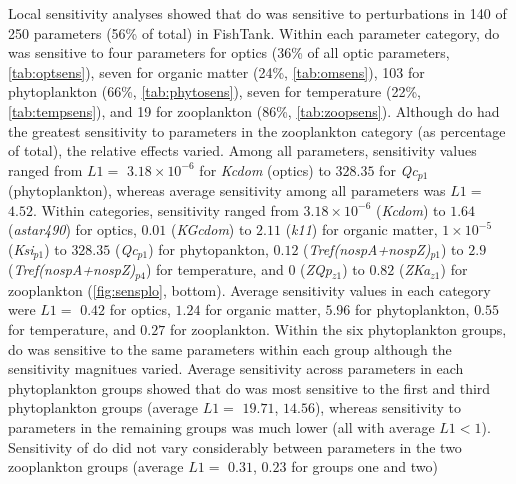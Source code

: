 \documentclass[letterpaper,12pt,oneside]{article}\usepackage[]{graphicx}\usepackage[]{color}
\begin{document}
Local sensitivity analyses showed that \ac{do} was sensitive to perturbations in 140 of 250 parameters (56\% of total) in FishTank. Within each parameter category, \ac{do} was sensitive to four parameters for optics (36\% of all optic parameters, \cref{tab:optsens}), seven for organic matter (24\%, \cref{tab:omsens}), 103 for phytoplankton (66\%, \cref{tab:phytosens}), seven for temperature (22\%, \cref{tab:tempsens}), and 19 for zooplankton (86\%, \cref{tab:zoopsens}). Although \ac{do} had the greatest sensitivity to parameters in the zooplankton category (as percentage of total), the relative effects varied. Among all parameters, sensitivity values ranged from $L1 = $ $3.18\times 10^{-6}$ for \textit{Kcdom} (optics) to $328.35$ for \textit{Qc$_{p1}$} (phytoplankton), whereas average sensitivity among all parameters was $L1 = $ $4.52$.  Within categories, sensitivity ranged from $3.18\times 10^{-6}$ (\textit{Kcdom}) to $1.64$ (\textit{astar490}) for optics, $0.01$ (\textit{KGcdom}) to $2.11$ (\textit{k11}) for organic matter, $1\times 10^{-5}$ (\textit{Ksi$_{p1}$}) to $328.35$ (\textit{Qc$_{p1}$}) for phytopankton, $0.12$ (\textit{Tref(nospA+nospZ)$_{p1}$}) to $2.9$ (\textit{Tref(nospA+nospZ)$_{p4}$}) for temperature, and $0$ (\textit{ZQp$_{z1}$}) to $0.82$ (\textit{ZKa$_{z1}$}) for zooplankton (\cref{fig:sensplo}, bottom).  Average sensitivity values in each category were $L1 = $ $0.42$ for optics, $1.24$ for organic matter, $5.96$ for phytoplankton, $0.55$ for temperature, and $0.27$ for zooplankton.  Within the six phytoplankton groups, \ac{do} was sensitive to the same parameters within each group although the sensitivity magnitues varied. Average sensitivity across parameters in each phytoplankton groups showed that \ac{do} was most sensitive to the first and third phytoplankton groups (average $L1 = $ $19.71$, $14.56$), whereas sensitivity to parameters in the remaining groups was much lower (all with average $L1 < 1$). Sensitivity of \ac{do} did not vary considerably between parameters in the two zooplankton groups (average $L1 = $ $0.31$, $0.23$ for groups one and two)
\end{document}
